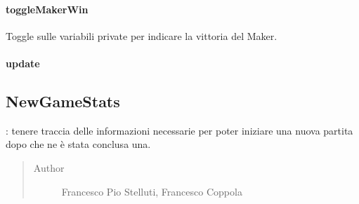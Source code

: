 \documentclass[letterpaper,10pt,italian,openany,oneside]{sphinxmanual}
\begin{document}
\paragraph{toggleMakerWin}
\label{\detokenize{source/it/unicam/cs/pa/mastermind/gamecore/CurrentGameStats:togglemakerwin}}

\begin{fulllineitems}
\label{\detokenize{source/it/unicam/cs/pa/mastermind/gamecore/CurrentGameStats:it.unicam.cs.pa.mastermind.gamecore.CurrentGameStats.toggleMakerWin()}}
Toggle sulle variabili private per indicare la vittoria del Maker.

\end{fulllineitems}



\paragraph{update}
\label{\detokenize{source/it/unicam/cs/pa/mastermind/gamecore/CurrentGameStats:update}}

\begin{fulllineitems}
\label{\detokenize{source/it/unicam/cs/pa/mastermind/gamecore/CurrentGameStats:it.unicam.cs.pa.mastermind.gamecore.CurrentGameStats.update()}}
\end{fulllineitems}



\subsection{NewGameStats}
\label{\detokenize{source/it/unicam/cs/pa/mastermind/gamecore/NewGameStats:newgamestats}}\label{\detokenize{source/it/unicam/cs/pa/mastermind/gamecore/NewGameStats::doc}}

\begin{fulllineitems}
\label{\detokenize{source/it/unicam/cs/pa/mastermind/gamecore/NewGameStats:it.unicam.cs.pa.mastermind.gamecore.NewGameStats}}
: tenere traccia delle informazioni necessarie per poter iniziare una nuova partita dopo che ne è stata conclusa una.
\begin{quote}\begin{description}
\item[{Author}] \leavevmode
Francesco Pio Stelluti, Francesco Coppola

\end{description}\end{quote}

\end{fulllineitems}
\end{document}
